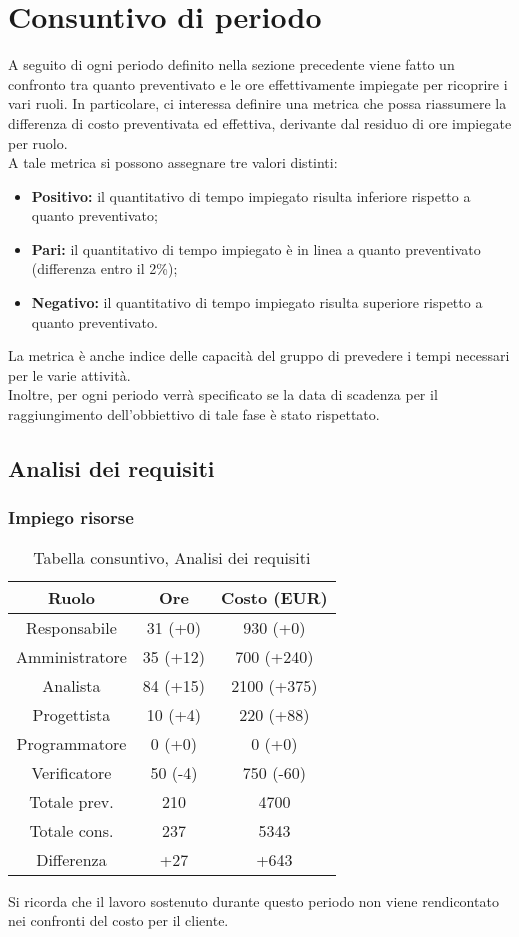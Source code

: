 \section{Consuntivo di periodo}
A seguito di ogni periodo definito nella sezione precedente viene fatto un confronto tra quanto preventivato e le ore effettivamente impiegate per ricoprire i vari ruoli. In particolare, ci interessa definire una metrica che possa riassumere la differenza di costo preventivata ed effettiva, derivante dal residuo di ore impiegate per ruolo. \\ A tale metrica si possono assegnare tre valori distinti:
\begin{itemize}
	\item \textbf{Positivo:} il quantitativo di tempo impiegato risulta inferiore rispetto a quanto preventivato;
	\item \textbf{Pari:} il quantitativo di tempo impiegato è in linea a quanto preventivato (differenza entro il 2\%);
	\item \textbf{Negativo:} il quantitativo di tempo impiegato risulta superiore rispetto a quanto preventivato.
\end{itemize}
La metrica è anche indice delle capacità del gruppo di prevedere i tempi necessari per le varie attività.
\\Inoltre, per ogni periodo verrà specificato se la data di scadenza per il raggiungimento dell'obbiettivo di tale fase è stato rispettato.
\subsection{Analisi dei requisiti}
\subsubsection{Impiego risorse}
\begin{table}[h]
\caption{Tabella consuntivo, Analisi dei requisiti}  
\begin{center}
\begin{tabular}{ |c|c|c|  }
 \hline
 Ruolo 		& Ore & Costo (EUR)\\
 \hline\hline
	Responsabile	& 31 (+0) & 930 (+0)\\
	Amministratore	& 35 (+12) & 700 (+240)\\
	Analista		& 84 (+15) & 2100 (+375)\\
	Progettista		& 10 (+4) & 220 (+88)\\
	Programmatore	& 0 (+0) & 0 (+0)\\
	Verificatore	& 50 (-4) & 750 (-60)\\
	\hline\hline
	Totale prev.	& 210 & 4700 \\
	Totale cons.	& 237 & 5343 \\
	Differenza		& +27 & +643 \\
 \hline
\end{tabular}
\end{center}
\end{table}
Si ricorda che il lavoro sostenuto durante questo periodo non viene rendicontato nei confronti del costo per il cliente.

